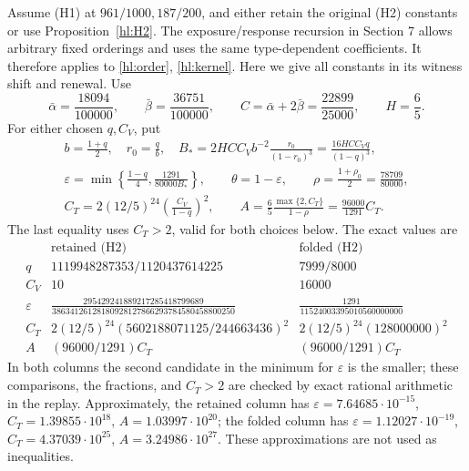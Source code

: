 Assume (H1) at $961/1000,187/200$, and either retain the
original (H2) constants or use Proposition~\ref{hl:H2}.
The exposure/response recursion in Section 7 allows arbitrary
fixed orderings and uses the same type-dependent coefficients.
It therefore applies to \eqref{hl:order}, \eqref{hl:kernel}.
Here we give all constants in its witness shift and renewal.
Use
\begin{equation}\label{hl:closingconstants}
 \bar\alpha=\frac{18094}{100000},\qquad
 \bar\beta=\frac{36751}{100000},\qquad
 C=\bar\alpha+2\bar\beta=\frac{22899}{25000},\qquad H=\frac65.
\end{equation}
For either chosen $q,C_V$, put
\begin{equation}\label{hl:shiftconstants}
\begin{gathered}
 b=\frac{1+q}{2},\quad r_0=\frac qb,\quad
 B_*=2HCC_V b^{-2}\frac{r_0}{(1-r_0)^3}
             =\frac{16HCC_Vq}{(1-q)^3},\\
 \varepsilon=\min\left\{\frac{1-q}{4},\frac{1291}{80000B_*}\right\},
 \qquad\theta=1-\varepsilon,\qquad
 \rho=\frac{1+\rho_0}{2}=\frac{78709}{80000},\\
 C_T=2(12/5)^{24}\left(\frac{C_V}{1-q}\right)^2,\qquad
 A=\frac65\frac{\max\{2,C_T\}}{1-\rho}
   =\frac{96000}{1291}C_T.
\end{gathered}
\end{equation}
The last equality uses $C_T>2$, valid for both choices below.
The exact values are
\begin{equation}\label{hl:closingtable}
\begin{array}{c|c|c}
 &\text{retained (H2)}&\text{folded (H2)}\\\hline
 q&1119948287353/1120437614225&7999/8000\\
 C_V&10&16000\\
 \varepsilon&
 \displaystyle\frac{295429241889217285418799689}
 {38634126128180928127866293784580458800250}&
 \displaystyle\frac{1291}{11524003395010560000000}\\[6pt]
 C_T&\displaystyle2(12/5)^{24}
                  (5602188071125/244663436)^2&
       \displaystyle2(12/5)^{24}(128000000)^2\\
 A&(96000/1291)C_T&(96000/1291)C_T
\end{array}
\end{equation}
In both columns the second candidate in the minimum for
$\varepsilon$ is the smaller; these comparisons, the fractions,
and $C_T>2$ are checked by exact rational arithmetic in the
replay.  Approximately, the retained column has
$\varepsilon=7.64685\cdot10^{-15}$,
$C_T=1.39855\cdot10^{18}$, $A=1.03997\cdot10^{20}$;
the folded column has $\varepsilon=1.12027\cdot10^{-19}$,
$C_T=4.37039\cdot10^{25}$, $A=3.24986\cdot10^{27}$.
These approximations are not used as inequalities.

